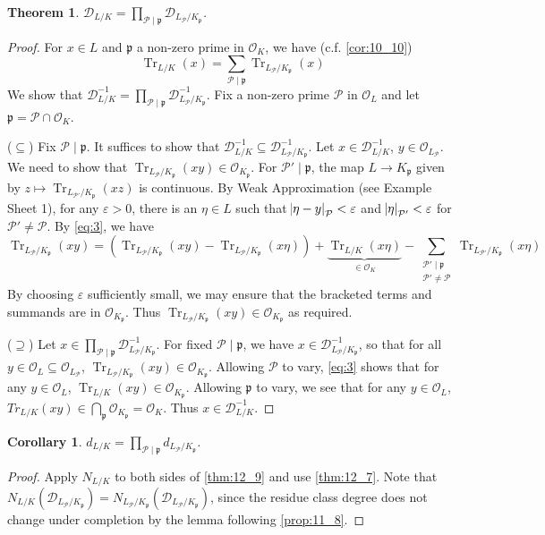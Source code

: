 \documentclass[11pt]{article}
\theoremstyle{definition}
\theoremstyle{plain}
\newtheorem{theorem}[definition]{Theorem}
\newtheorem{corollary}[definition]{Corollary}
\theoremstyle{remark}
\DeclareMathOperator{\Tr}{Tr}
\newcommand{\cD}{\mathcal{D}}
\newcommand{\cO}{\mathcal{O}}
\newcommand{\cP}{\mathcal{P}}
\newcommand{\fp}{\mathfrak{p}}
\begin{document}
\begin{theorem}\label{thm:12_9}
    $\cD_{L/K} = \prod_{\cP \mid \fp} \cD_{L_\cP / K_\fp}$.
\end{theorem}
\begin{proof}
    For $x \in L$ and $\fp$ a non-zero prime in $\cO_K$, we have (c.f. \autoref{cor:10_10})
    \begin{equation}\label{eq:3}
        \Tr_{L/K}(x) = \sum_{\cP \mid \fp} \Tr_{L_\cP / K_\fp}(x)
    \end{equation}
    We show that $\cD_{L/K}^{-1} = \prod_{\cP \mid \fp} \cD_{L_\cP / K_\fp}^{-1}$. Fix a non-zero prime $\cP$ in $\cO_L$ and let $\fp = \cP \cap \cO_K$.

    \noindent ($\subseteq$) Fix $\cP \mid \fp$. It suffices to show that $\cD_{L/K}^{-1} \subseteq \cD_{L_\cP / K_\fp}^{-1}$. Let $x \in \cD_{L/K}^{-1}$, $y \in \cO_{L_\cP}$. We need to show that $\Tr_{L_\cP / K_\fp}(xy) \in \cO_{K_\fp}$. For $\cP' \mid \fp$, the map $L \to K_\fp$ given by $z \mapsto \Tr_{L_{\cP'} / K_\fp}(x z)$ is continuous. By Weak Approximation (see Example Sheet 1), for any $\varepsilon > 0$, there is an $\eta \in L$ such that $\abs{\eta - y}_\cP < \varepsilon$ and $\abs{\eta}_{\cP'} < \varepsilon$ for $\cP' \neq \cP$. By \eqref{eq:3}, we have
    \begin{equation*}
        \Tr_{L_\cP / K_\fp}(xy) = \left(\Tr_{L_\cP / K_\fp}(xy) - \Tr_{L_\cP / K_\fp}(x \eta)\right) + \underbrace{\Tr_{L/K}(x \eta)}_{\in \cO_K} - \sum_{\substack{\cP' \mid \fp\\\cP' \neq \cP}} \Tr_{L_{\cP'} / K_\fp}(x \eta)
    \end{equation*}
    By choosing $\varepsilon$ sufficiently small, we may ensure that the bracketed terms and summands are in $\cO_{K_\fp}$. Thus $\Tr_{L_\cP / K_\fp}(xy) \in \cO_{K_\fp}$ as required.

    \noindent ($\supseteq$) Let $x \in \prod_{\cP \mid \fp} \cD_{L_\cP / K_\fp}^{-1}$. For fixed $\cP \mid \fp$, we have $x \in \cD_{L_\cP / K_\fp}^{-1}$, so that for all $y \in \cO_L \subseteq \cO_{L_\cP}$, $\Tr_{L_\cP / K_\fp}(xy) \in \cO_{K_\fp}$. Allowing $\cP$ to vary, \eqref{eq:3} shows that for any $y \in \cO_L$, $\Tr_{L/K}(xy) \in \cO_{K_\fp}$. Allowing $\fp$ to vary, we see that for any $y \in \cO_L$, $Tr_{L/K}(xy) \in \bigcap_\fp \cO_{K_\fp} = \cO_K$. Thus $x \in \cD_{L/K}^{-1}$.
\end{proof}

\begin{corollary}\label{cor:12_10}
    $d_{L/K} = \prod_{\cP \mid \fp} d_{L_\cP / K_\fp}$.
\end{corollary}
\begin{proof}
    Apply $N_{L/K}$ to both sides of \autoref{thm:12_9} and use \autoref{thm:12_7}. Note that $N_{L/K}(\cD_{L_\cP / K_\fp}) = N_{L_\cP / K_\fp}(\cD_{L_\cP / K_\fp})$, since the residue class degree does not change under completion by the lemma following \autoref{prop:11_8}.
\end{proof}
\end{document}
